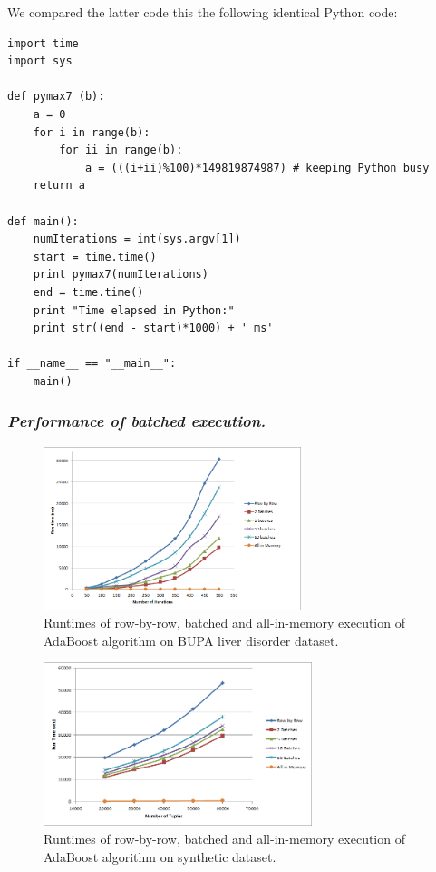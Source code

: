 We compared the latter code this the following identical Python code:
\begin{verbatim}
import time
import sys

def pymax7 (b):     
    a = 0
    for i in range(b):
        for ii in range(b):
            a = (((i+ii)%100)*149819874987) # keeping Python busy
    return a

def main():    
    numIterations = int(sys.argv[1])        
    start = time.time()
    print pymax7(numIterations)
    end = time.time()
    print "Time elapsed in Python:"
    print str((end - start)*1000) + ' ms'        

if __name__ == "__main__":
    main()
\end{verbatim}




\subsubsection*{\itshape Performance of batched execution.}
\begin{figure}[ht]
\centering
\includegraphics[height=180px]{ada2.png}
\caption{Runtimes of row-by-row, batched and all-in-memory execution of AdaBoost algorithm on BUPA liver disorder dataset.}
\label{fig:adabatch1}
\end{figure}

\begin{figure}[ht]
\centering
\includegraphics[height=180px]{ada3.png}
\caption{Runtimes of row-by-row, batched and all-in-memory execution of AdaBoost algorithm on synthetic dataset.}
\label{fig:adabatch2}
\end{figure}

